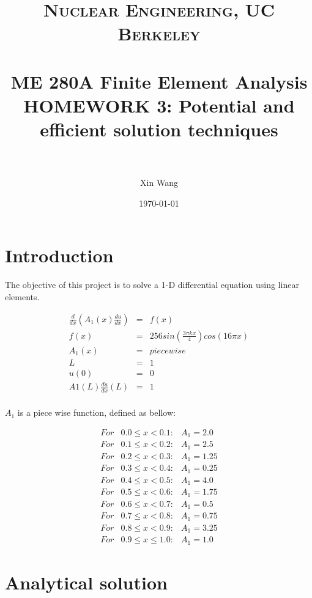 \documentclass[paper=a4, fontsize=11pt]{article} %
\title{	
\normalfont \normalsize 
\textsc{Nuclear Engineering, UC Berkeley} \\ [25pt] %
\horrule{0.5pt} \\[0.4cm] %
\huge ME 280A Finite Element Analysis \\HOMEWORK 3: Potential and efficient solution techniques  \\  %
\horrule{2pt} \\[0.5cm] %
}
\author{Xin Wang} %
\date{\normalsize\today} %
\begin{document}
\maketitle %

\newpage
\section{Introduction}
The objective of this project is to solve a 1-D differential equation using linear elements.  

\begin{eqnarray}
\frac{d}{dx}(A_1(x) \frac{du}{dx}) &=& f(x)\nonumber\\
f(x)&=&256sin(\frac{3\pi kx}{4})cos(16 \pi x) \nonumber\\
A_1(x)& = & piecewise\nonumber\\
L&=&1 \nonumber\\
u(0)& =& 0 \nonumber\\
A1(L)\frac{du}{dx}(L) &=& 1 \nonumber\\
\end{eqnarray}

$A_1$ is a piece wise function, defined as bellow:

\begin{eqnarray}
For & 0.0 \leq x < 0.1 :& A_1 = 2.0 \nonumber\\
For & 0.1 \leq x < 0.2 :& A_1 = 2.5 \nonumber\\
For & 0.2 \leq x < 0.3 :& A_1 = 1.25 \nonumber\\
For & 0.3 \leq x < 0.4 :& A_1 = 0.25 \nonumber\\
For & 0.4 \leq x < 0.5 :& A_1 = 4.0 \nonumber\\
For & 0.5 \leq x < 0.6 :& A_1 = 1.75 \nonumber\\
For & 0.6 \leq x < 0.7 :& A_1 = 0.5 \nonumber\\
For & 0.7 \leq x < 0.8 :& A_1 = 0.75 \nonumber\\
For & 0.8 \leq x < 0.9 :& A_1 = 3.25\nonumber\\
For & 0.9 \leq x \leq 1.0 :& A_1 = 1.0
\end{eqnarray}

\section{Analytical solution}
\end{document}
